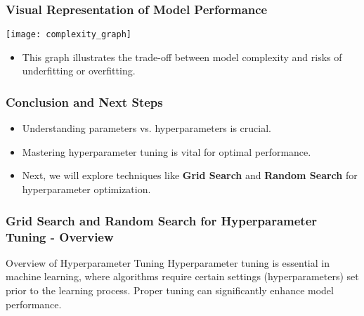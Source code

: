 \documentclass[aspectratio=169]{beamer}
\begin{document}
\begin{frame}[fragile]
    \frametitle{Visual Representation of Model Performance}
    \centering
    \texttt{[image: complexity\_graph]} %
    \begin{itemize}
        \item This graph illustrates the trade-off between model complexity and risks of underfitting or overfitting.
    \end{itemize}
\end{frame}

\begin{frame}[fragile]
    \frametitle{Conclusion and Next Steps}
    \begin{itemize}
        \item Understanding parameters vs. hyperparameters is crucial.
        \item Mastering hyperparameter tuning is vital for optimal performance.
        \item Next, we will explore techniques like \textbf{Grid Search} and \textbf{Random Search} for hyperparameter optimization.
    \end{itemize}
\end{frame}

\begin{frame}[fragile]
    \frametitle{Grid Search and Random Search for Hyperparameter Tuning - Overview}
    \begin{block}{Overview of Hyperparameter Tuning}
        Hyperparameter tuning is essential in machine learning, where algorithms require certain settings (hyperparameters) set prior to the learning process. 
        Proper tuning can significantly enhance model performance.
    \end{block}
\end{frame}
\end{document}
